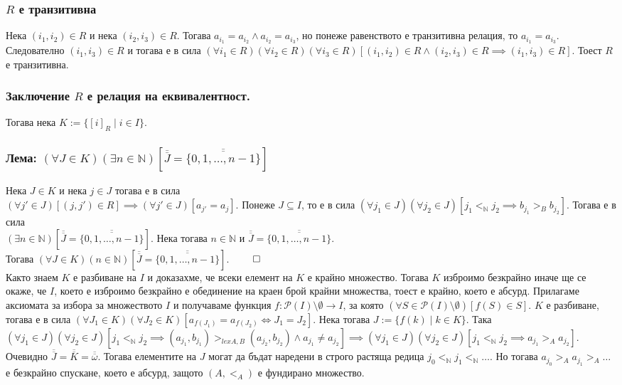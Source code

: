 \documentclass[a4paper, 12pt, oneside]{article}
\begin{document}
\subsubsection*{\(R\) е транзитивна}
Нека \((i_1, i_2) \in R\) и нека \((i_2, i_3) \in R\).
Тогава \(a_{i_1} = a_{i_2} \land a_{i_2} = a_{i_3}\), но понеже равенството е транзитивна релация, то \(a_{i_1} = a_{i_3}\).
Следователно \((i_1, i_3) \in R\) и тогава е в сила \((\forall i_1 \in R)(\forall i_2 \in R)(\forall i_3 \in R)[(i_1, i_2) \in R \land (i_2, i_3) \in R \implies (i_1, i_3) \in R]\).
Тоест \(R\) е транзитивна. 
\subsubsection*{Заключение \(R\) е релация на еквивалентност.}
Тогава нека \(K := \{[i]_R \; | \; i \in I\}\).
\subsubsection*{Лема: \((\forall J \in K)(\exists n \in \mathbb{N})[\overline{\overline{J}} = \overline{\overline{\{0, 1, \dots, n - 1\}}}]\)}
Нека \(J \in K\) и нека \(j \in J\) тогава е в сила \\
\((\forall j' \in J)[(j, j') \in R] \implies (\forall j' \in J)[a_{j'} = a_j]\).
Понеже \(J \subseteq I\), то е в сила \((\forall j_1 \in J)(\forall j_2 \in J)[j_1 <_{\mathbb{N}} j_2 \implies b_{j_1} >_B b_{j_2}]\). Тогава е в сила \\
\((\exists n \in \mathbb{N})[\overline{\overline{J}} = \overline{\overline{\{0, 1, \dots, n - 1\}}}]\).
Нека тогава \(n \in \mathbb{N}\) и \(\overline{\overline{J}} = \overline{\overline{\{0, 1, \dots, n - 1\}}}\). \\
Тогава \((\forall J \in K)(n \in \mathbb{N})[\overline{\overline{J}} = \overline{\overline{\{0, 1, \dots, n - 1\}}}]\). \(\qed\) \\
Както знаем \(K\) е разбиване на \(I\) и доказахме, че всеки елемент на \(K\) е крайно множество.
Тогава \(K\) изброимо безкрайно иначе ще се окаже, че \(I\), което е изброимо безкрайно е обединение на краен брой крайни множества, тоест е крайно, което е абсурд.
Прилагаме аксиомата за избора за множеството \(I\) и получаваме функция \(f : \mathcal{P}(I)\setminus\emptyset \to I\),
за която \((\forall S \in \mathcal{P}(I)\setminus\emptyset)[f(S) \in S]\).
\(K\) е разбиване, тогава е в сила \((\forall J_1 \in K)(\forall J_2 \in K)[a_{f(J_1)} = a_{f(J_2)} \iff J_1 = J_2]\).
Нека тогава \(J := \{f(k) \; | \; k \in K\}\).
Така \((\forall j_1 \in J)(\forall j_2 \in J)[j_1 <_{\mathbb{N}} j_2 \implies (a_{j_1}, b_{j_1}) >_{lex A, B} (a_{j_2}, b_{j_2}) \land a_{j_1} \neq a_{j_2}] \implies
(\forall j_1 \in J)(\forall j_2 \in J)[j_1 <_{\mathbb{N}} j_2 \implies a_{j_1} >_A a_{j_2}]\).
Очевидно \(\overline{\overline{J}} = \overline{\overline{K}} = \overline{\overline{\omega}}\).
Тогава елементите на \(J\) могат да бъдат наредени в строго растяща редица \(j_0 <_{\mathbb{N}} j_1  <_{\mathbb{N}} \dots\).
Но тогава \(a_{j_0} >_A a_{j_1} >_A \dots\) е безкрайно спускане, което е абсурд, защото \((A, <_A)\) е фундирано множество.
\end{document}
